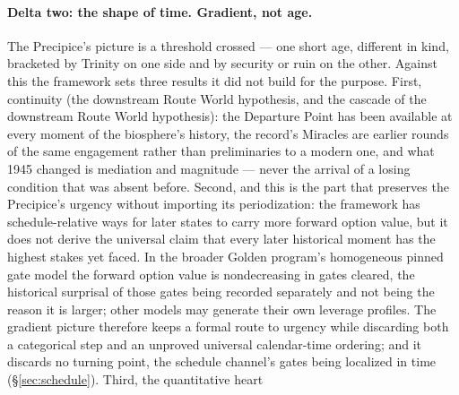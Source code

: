 \paragraph{Delta two: the shape of time. Gradient, not age.} The
Precipice's picture is a threshold crossed --- one short age, different
in kind, bracketed by Trinity on one side and by security or ruin on
the other. Against this the framework sets three results it did not
build for the purpose. First, continuity
(the downstream Route World hypothesis, and the cascade of
the downstream Route World hypothesis): the Departure Point has been available at
every moment of the biosphere's history, the record's Miracles are
earlier rounds of the same engagement rather than preliminaries to a
modern one, and what 1945 changed is mediation and magnitude ---
never the arrival of a losing condition that was absent before.
Second, and this is the part that preserves the Precipice's urgency
without importing its periodization: the framework has schedule-relative
ways for later states to carry more forward option value, but it does
not derive the universal claim that every later historical moment has
the highest stakes yet faced. In the broader Golden program's
homogeneous pinned gate model the forward option value is nondecreasing
in gates cleared, the historical surprisal of those gates being recorded
separately and not being the reason it is larger; other models may
generate their own leverage profiles. The gradient picture therefore
keeps a formal route to urgency while discarding both a categorical step
and an unproved universal calendar-time ordering; and it discards no
turning point, the schedule channel's gates being localized in time
(\S\ref{sec:schedule}). Third, the quantitative heart
